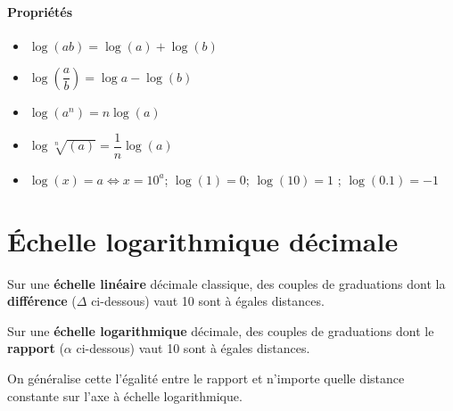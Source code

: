 \paragraph{Propriétés}
\begin{itemize}
    \item $\log{(ab)}=\log{(a)} + \log{(b)}$
    \item $\log{\left(\dfrac{a}{b}\right)}=\log{a} - \log{(b)}$
    \item $\log{(a^n)}=n\log{(a)}$
    \item $\log{\sqrt[n]{(a)}}=\dfrac{1}{n}\log{(a)}$
    \item $\log(x)=a \Leftrightarrow x=10^a $; $\log(1) = 0$; 
          $\log(10) = 1$ ; $\log(0.1) = -1$
\end{itemize}


\section{\'Echelle logarithmique décimale}
Sur une \textbf{échelle linéaire} décimale classique, des couples de 
graduations dont la \textbf{différence} ($\Delta$ ci-dessous) vaut 10 sont à 
égales distances. 

\begin{center}
    
\end{center}

Sur une \textbf{échelle logarithmique} décimale, des couples de graduations 
dont le \textbf{rapport} ($\alpha$ ci-dessous) vaut 10 sont à égales distances.

\begin{center}
    
\end{center}

On généralise cette l'égalité entre le rapport et n'importe quelle 
distance constante sur l'axe à échelle logarithmique.

